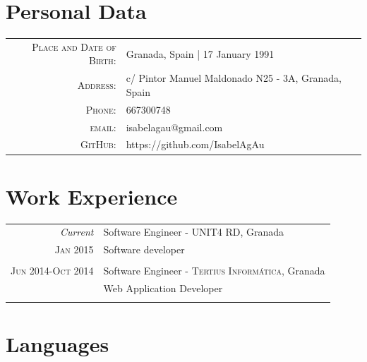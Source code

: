 \documentclass[a4paper,10pt]{article} %
\begin{document}

\section{Personal Data}

\begin{tabular}{rl}
\textsc{Place and Date of Birth:} & Granada, Spain  | 17 January 1991 \\
\textsc{Address:} & c/ Pintor Manuel Maldonado N25 - 3A, Granada, Spain \\
\textsc{Phone:} & 667300748\\
\textsc{email:} & {isabelagau@gmail.com}\\
\textsc{GitHub:} & {https://github.com/IsabelAgAu}
\end{tabular}


\section{Work Experience}

\begin{tabular}{r|p{11cm}}
\emph{Current} & Software Engineer - \textsc{UNIT4 RD}, Granada \\
\textsc{Jan 2015} 
& \footnotesize{Software developer}\\
\multicolumn{2}{c}{} \\


\textsc{Jun 2014-Oct 2014} & Software Engineer - \textsc{Tertius Informática},
Granada \emph{}\\
& \footnotesize{Web Application Developer}\\
\multicolumn{2}{c}{} \\


\end{tabular}



\section{Languages}
\end{document}

